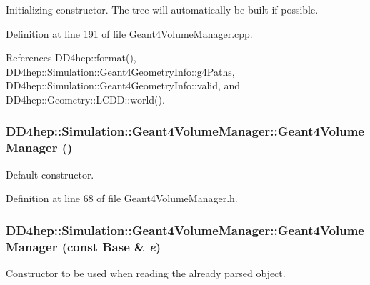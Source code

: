 Initializing constructor. The tree will automatically be built if possible. 

Definition at line 191 of file Geant4VolumeManager.cpp.

References DD4hep::format(), DD4hep::Simulation::Geant4GeometryInfo::g4Paths, DD4hep::Simulation::Geant4GeometryInfo::valid, and DD4hep::Geometry::LCDD::world().\hypertarget{class_d_d4hep_1_1_simulation_1_1_geant4_volume_manager_aaa373dec70850279290ca95c852d19db}{
\subsubsection[{Geant4VolumeManager}]{\setlength{\rightskip}{0pt plus 5cm}DD4hep::Simulation::Geant4VolumeManager::Geant4VolumeManager ()}}
\label{class_d_d4hep_1_1_simulation_1_1_geant4_volume_manager_aaa373dec70850279290ca95c852d19db}


Default constructor. 

Definition at line 68 of file Geant4VolumeManager.h.\hypertarget{class_d_d4hep_1_1_simulation_1_1_geant4_volume_manager_a7f1f31944a14314f82c3e82cc39e46ea}{
\subsubsection[{Geant4VolumeManager}]{\setlength{\rightskip}{0pt plus 5cm}DD4hep::Simulation::Geant4VolumeManager::Geant4VolumeManager (const {\bf Base} \& {\em e})}}
\label{class_d_d4hep_1_1_simulation_1_1_geant4_volume_manager_a7f1f31944a14314f82c3e82cc39e46ea}


Constructor to be used when reading the already parsed object. 


